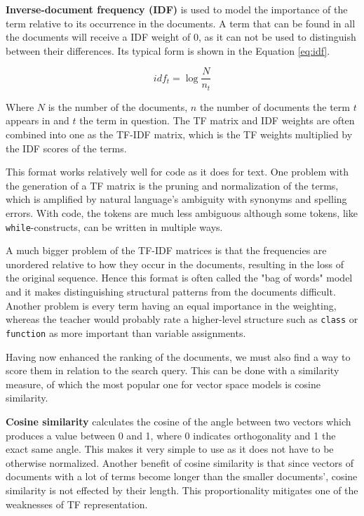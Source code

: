\textbf{Inverse-document frequency (IDF)} is used to model the importance of the term relative to its occurrence in the documents. A term that can be found in all the documents will receive a IDF weight of 0, as it can not be used to distinguish between their differences. Its typical form is shown in the Equation \ref{eq:idf}.

\begin{equation}
\label{eq:idf}
idf_t=\log\frac{N}{n_t}
\end{equation}
\vspace{-6pt}

Where $N$ is the number of the documents, $n$ the number of documents the term $t$ appears in and $t$ the term in question. The TF matrix and IDF weights are often combined into one as the TF-IDF matrix, which is the TF weights multiplied by the IDF scores of the terms.

This format works relatively well for code as it does for text. One problem with the generation of a TF matrix is the pruning and normalization of the terms, which is amplified by natural language's ambiguity with synonyms and spelling errors. With code, the tokens are much less ambiguous although some tokens, like \texttt{while}-constructs, can be written in multiple ways.

A much bigger problem of the TF-IDF matrices is that the frequencies are unordered relative to how they occur in the documents, resulting in the loss of the original sequence. Hence this format is often called the "bag of words" model and it makes distinguishing structural patterns from the documents difficult. Another problem is every term having an equal importance in the weighting, whereas the teacher would probably rate a higher-level structure such as \texttt{class} or \texttt{function} as more important than variable assignments.

Having now enhanced the ranking of the documents, we must also find a way to score them in relation to the search query. This can be done with a similarity measure, of which the most popular one for vector space models is cosine similarity.

\textbf{Cosine similarity} calculates the cosine of the angle between two vectors which produces a value between 0 and 1, where 0 indicates orthogonality and 1 the exact same angle. This makes it very simple to use as it does not have to be otherwise normalized. Another benefit of cosine similarity is that since vectors of documents with a lot of terms become longer than the smaller documents', cosine similarity is not effected by their length. This proportionality mitigates one of the weaknesses of TF representation.

